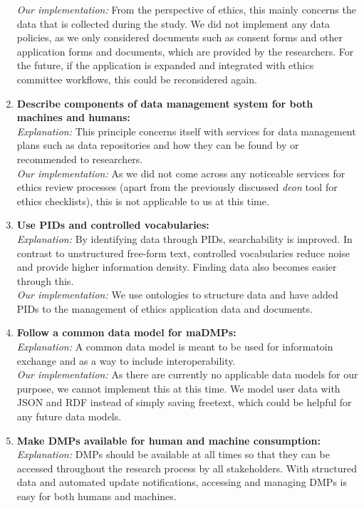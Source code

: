 \documentclass[10pt]{article}
\begin{document}
\begin{enumerate}
\textit{Our implementation:} From the perspective of ethics, this mainly concerns the data that is collected during the study. We did not implement any data policies, as we only considered documents such as consent forms and other application forms and documents, which are provided by the researchers. For the future, if the application is expanded and integrated with ethics committee workflows, this could be reconsidered again.
\item \textbf{Describe components of data management system for both machines and humans:} \\
\textit{Explanation:} This principle concerns itself with services for data management plans such as data repositories and how they can be found by or recommended to researchers. \\
\textit{Our implementation:} As we did not come across any noticeable services for ethics review processes (apart from the previously discussed \textit{deon} tool for ethics checklists), this is not applicable to us at this time.
\item \textbf{Use PIDs and controlled vocabularies:}  \\
\textit{Explanation:} By identifying data through PIDs, searchability is improved. In contrast to unstructured free-form text, controlled vocabularies reduce noise and provide higher information density. Finding data also becomes easier through this.\\
\textit{Our implementation:} We use ontologies to structure data and have added PIDs to the management of ethics application data and documents.
\item \textbf{Follow a common data model for maDMPs:}  \\
\textit{Explanation:} A common data model is meant to be used for informatoin exchange and as a way to include interoperability.\\
\textit{Our implementation:} As there are currently no applicable data models for our purpose, we cannot implement this at this time. We model user data with JSON and RDF instead of simply saving freetext, which could be helpful for any future data models.
\item \textbf{Make DMPs available for human and machine consumption:}  \\
\textit{Explanation:} DMPs should be available at all times so that they can be accessed throughout the research process by all stakeholders. With structured data and automated update notifications, accessing and managing DMPs is easy for both humans and machines. \\

\end{enumerate}
\end{document}
